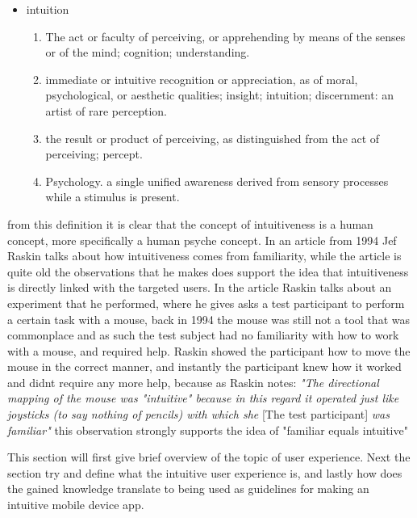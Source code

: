 \begin{itemize}
\item intuition\\
\begin{enumerate}
\item The act or faculty of perceiving, or apprehending by means of the senses or of the mind; cognition; understanding.
\item immediate or intuitive recognition or appreciation, as of moral, psychological, or aesthetic qualities; insight; intuition; discernment:
an artist of rare perception.
\item the result or product of perceiving, as distinguished from the act of perceiving; percept.
\item Psychology. a single unified awareness derived from sensory processes while a stimulus is present.
\end{enumerate}
\end{itemize} from this definition it is clear that the concept of intuitiveness is a human concept, more specifically a human psyche concept. In an article from 1994 Jef Raskin\cite{JRaskin} talks about how intuitiveness comes from familiarity, while the article is quite old the observations that he makes does support the idea that intuitiveness is directly linked with the targeted users. In the article Raskin talks about an experiment that he performed, where he gives asks a test participant to perform a certain task with a mouse, back in 1994 the mouse was still not a tool that was commonplace and as such the test subject had no familiarity with how to work with a mouse, and required help. Raskin showed the participant how to move the mouse in the correct manner, and instantly the participant knew how it worked and didnt require any more help, because as Raskin notes: \textit{"The directional mapping of the mouse was "intuitive" because in this regard it operated just like joysticks (to say nothing of pencils) with which she} [The test participant] \textit{was familiar"}\cite{JRaskin} this observation strongly supports the idea of "familiar equals intuitive"



 This section will first give brief overview of the topic of user experience. Next the section try and define what the intuitive user experience is, and lastly how does the gained knowledge translate to being used as guidelines for making an intuitive mobile device app.  

